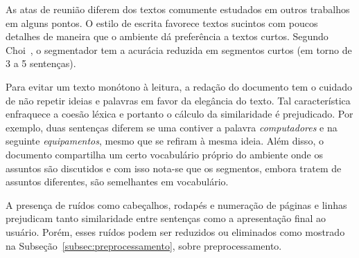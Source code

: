 	As atas de reunião diferem dos textos comumente estudados em outros trabalhos em alguns pontos. O estilo de escrita favorece textos sucintos com poucos detalhes de maneira que o ambiente dá preferência a textos curtos. Segundo Choi~\cite{Choi2001-LSA}, o segmentador tem a acurácia reduzida em segmentos curtos (em torno de 3 a 5 sentenças).
	
	Para evitar um texto monótono à leitura, a redação do documento tem o cuidado de não repetir ideias e palavras em favor da elegância do texto. Tal característica enfraquece a coesão léxica e portanto o cálculo da similaridade é prejudicado. Por exemplo, duas sentenças diferem se uma contiver a palavra \textit{computadores} e na seguinte \textit{equipamentos}, mesmo que se refiram à mesma ideia. Além disso, o documento compartilha um certo vocabulário próprio do ambiente onde os assuntos são discutidos e com isso nota-se que os segmentos, embora tratem de assuntos diferentes, são semelhantes em vocabulário.
	
A presença de ruídos como cabeçalhos, rodapés e numeração de páginas e linhas prejudicam tanto similaridade entre sentenças como a apresentação final ao usuário. Porém, esses ruídos podem ser reduzidos ou eliminados como mostrado na Subseção~\ref{subsec:preprocessamento}, sobre preprocessamento.
